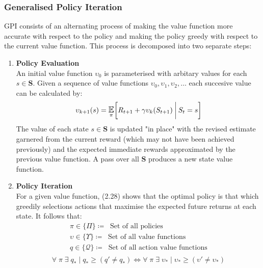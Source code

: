 \subsubsection{Generalised Policy Iteration}
GPI consists of an alternating process of making the value function
more accurate with respect to the policy and making the policy
greedy with respect to the current value function. This process
is decomposed into two separate steps:
\begin{enumerate}
    \item \textbf{Policy Evaluation} \\
        An initial value function $\upsilon_0$ is parameterised with arbitary values for each $s \in \mathbf{S}$.
        Given a sequence of value functions $\upsilon_0, \upsilon_1, \upsilon_2, \hdots$ each succesive value
        can be calculated by:
        \begin{equation}
            \upsilon_{k+1}(s) = \E_\pi \Condition{R_{t+1} + \gamma \upsilon_{k}(S_{t+1})}{S_t = s}
        \end{equation}
        The value of each state $s \in \mathbf{S}$ is updated "in place" with the revised estimate garnered
        from the current reward (which may not have been achieved previously) and the expected immediate rewards
        approximated by the previous value function. A pass over all $\mathbf{S}$ produces a new state value function.
    \item \textbf{Policy Iteration} \\
        For a given value function, (2.28) shows that the optimal policy is that which greedily
        selections actions that maximise the expected future returns at each state. It follows that:
        \begin{equation}
            \begin{gathered}
                \pi \in \{\Pi\} \coloneqq \;\; \text{Set of all policies}\\
                \upsilon \in \{\Upsilon\} \coloneqq \;\; \text{Set of all value functions}\\
                q \in \{\mathbf{\mathcal{Q}}\} \coloneqq \;\; \text{Set of all action value functions}\\
            \end{gathered}
        \end{equation}
        \begin{equation}
            \forall \; \pi  \; \exists \; q_*  \mid q_* \geq (q' \neq q_*) \Longleftrightarrow \forall \; \pi  \; \exists \; \upsilon_*  \mid \upsilon_* \geq (\upsilon' \neq \upsilon_*)

\end{equation}
\end{enumerate}

